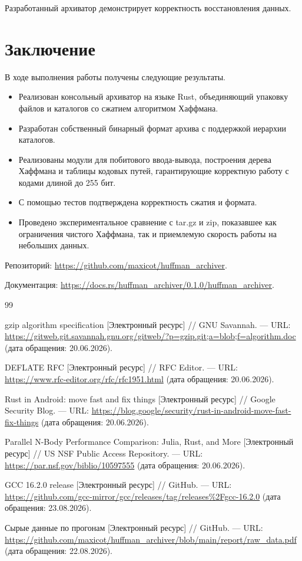 \documentclass[a4paper]{article}
\begin{document}
Разработанный архиватор демонстрирует корректность восстановления данных.

\section{Заключение}

В ходе выполнения работы получены следующие результаты.

\begin{itemize}
    \item Реализован консольный архиватор на языке Rust, объединяющий упаковку файлов и каталогов со сжатием алгоритмом Хаффмана.
    \item Разработан собственный бинарный формат архива с поддержкой иерархии каталогов.
    \item Реализованы модули для побитового ввода-вывода, построения дерева Хаффмана и таблицы кодовых путей, гарантирующие корректную работу с кодами длиной до 255 бит.
    \item С помощью тестов подтверждена корректность сжатия и формата.
    \item Проведено экспериментальное сравнение с tar.gz и zip, показавшее как ограничения чистого Хаффмана, так и приемлемую скорость работы на небольших данных.
\end{itemize}

Репозиторий: \url{https://github.com/maxicot/huffman_archiver}.

Документация: \url{https://docs.rs/huffman_archiver/0.1.0/huffman_archiver}.

\begin{thebibliography}{99}

 gzip algorithm specification [Электронный ресурс] // GNU Savannah. --- URL: \url{https://gitweb.git.savannah.gnu.org/gitweb/?p=gzip.git;a=blob;f=algorithm.doc} (дата обращения: 20.06.2026).

 DEFLATE RFC [Электронный ресурс] // RFC Editor. --- URL: \url{https://www.rfc-editor.org/rfc/rfc1951.html} (дата обращения: 20.06.2026).

 Rust in Android: move fast and fix things [Электронный ресурс] // Google Security Blog. --- URL: \url{https://blog.google/security/rust-in-android-move-fast-fix-things} (дата обращения: 20.06.2026).

 Parallel N-Body Performance Comparison: Julia, Rust, and More [Электронный ресурс] // US NSF Public Access Repository. --- URL: \url{https://par.nsf.gov/biblio/10597555} (дата обращения: 20.06.2026).

 GCC 16.2.0 release [Электронный ресурс] // GitHub. --- URL: \url{https://github.com/gcc-mirror/gcc/releases/tag/releases%2Fgcc-16.2.0} (дата обращения: 23.08.2026).

 Сырые данные по прогонам [Электронный ресурс] // GitHub. --- URL: \url{https://github.com/maxicot/huffman_archiver/blob/main/report/raw_data.pdf} (дата обращения: 22.08.2026).

\end{thebibliography}
\end{document}
